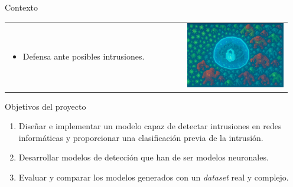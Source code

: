 \begin{frame}{Contexto}
\begin{tabular}{ >{\raggedright\arraybackslash}m{0.6\linewidth} >{\centering\arraybackslash}m{0.35\linewidth} }
    \begin{itemize}
      \item Defensa ante posibles intrusiones.
    \end{itemize} &
    \includegraphics[width=\linewidth]{./img/atacados.png} \\
  \end{tabular}
\end{frame}


\begin{frame}{Objetivos del proyecto}
    \begin{enumerate}
        \item  Diseñar e implementar un modelo capaz de detectar intrusiones en redes informáticas y proporcionar una clasificación previa de la intrusión.
        \vspace{10mm}
        \item Desarrollar modelos de detección que han de ser modelos neuronales.
        \vspace{10mm}
        \item Evaluar y comparar los modelos generados con un \textit{dataset} real y complejo.
    \end{enumerate}
\end{frame}

